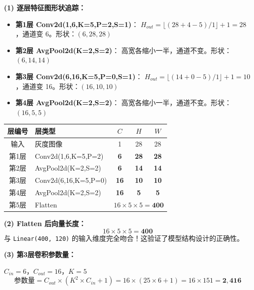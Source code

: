\documentclass[a4paper,11pt]{ctexart}
\begin{document}
\begin{solutionbox}[参考答案与详细解析]
    \textbf{(1) 逐层特征图形状追踪：}

    \begin{itemize}
        \item \textbf{第1层 Conv2d(1,6,K=5,P=2,S=1)}：
            $H_{out} = \lfloor(28+4-5)/1\rfloor+1 = 28$，通道变 6。形状：$(6, 28, 28)$
        \item \textbf{第2层 AvgPool2d(K=2,S=2)}：
            高宽各缩小一半，通道不变。形状：$(6, 14, 14)$
        \item \textbf{第3层 Conv2d(6,16,K=5,P=0,S=1)}：
            $H_{out} = \lfloor(14+0-5)/1\rfloor+1 = 10$，通道变 16。形状：$(16, 10, 10)$
        \item \textbf{第4层 AvgPool2d(K=2,S=2)}：
            高宽各缩小一半，通道不变。形状：$(16, 5, 5)$
    \end{itemize}

    \begin{center}
    \begin{tabular}{clccc}
        \toprule
        层编号 & 层类型 & $C$ & $H$ & $W$ \\
        \midrule
        输入 & 灰度图像 & 1 & 28 & 28 \\
        第1层 & Conv2d(1,6,K=5,P=2) & \textbf{6} & \textbf{28} & \textbf{28} \\
        第2层 & AvgPool2d(K=2,S=2) & \textbf{6} & \textbf{14} & \textbf{14} \\
        第3层 & Conv2d(6,16,K=5,P=0) & \textbf{16} & \textbf{10} & \textbf{10} \\
        第4层 & AvgPool2d(K=2,S=2) & \textbf{16} & \textbf{5} & \textbf{5} \\
        第5层 & Flatten & \multicolumn{3}{c}{$16 \times 5 \times 5 = \mathbf{400}$} \\
        \bottomrule
    \end{tabular}
    \end{center}

    \textbf{(2) Flatten 后向量长度：}
    \begin{equation}
        16 \times 5 \times 5 = \mathbf{400}
    \end{equation}
    与 \texttt{Linear(400, 120)} 的输入维度完全吻合！这验证了模型结构设计的正确性。

    \vspace{0.5em}
    \textbf{(3) 第3层卷积参数量：}

    $C_{in}=6$，$C_{out}=16$，$K=5$
    \begin{equation}
        \text{参数量} = C_{out} \times (K^2 \times C_{in} + 1) = 16 \times (25 \times 6 + 1) = 16 \times 151 = \mathbf{2{,}416}
    \end{equation}


\end{solutionbox}
\end{document}
